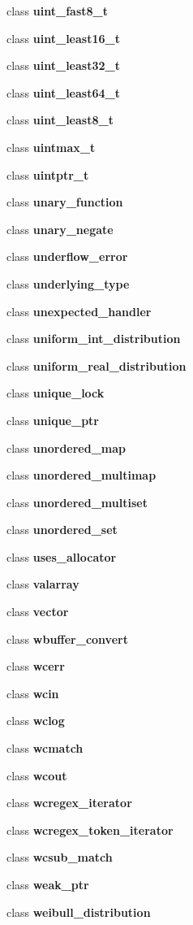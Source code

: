 \begin{DoxyCompactItemize}
class {\bf uint\+\_\+fast8\+\_\+t}
\item 
class {\bf uint\+\_\+least16\+\_\+t}
\item 
class {\bf uint\+\_\+least32\+\_\+t}
\item 
class {\bf uint\+\_\+least64\+\_\+t}
\item 
class {\bf uint\+\_\+least8\+\_\+t}
\item 
class {\bf uintmax\+\_\+t}
\item 
class {\bf uintptr\+\_\+t}
\item 
class {\bf unary\+\_\+function}
\item 
class {\bf unary\+\_\+negate}
\item 
class {\bf underflow\+\_\+error}
\item 
class {\bf underlying\+\_\+type}
\item 
class {\bf unexpected\+\_\+handler}
\item 
class {\bf uniform\+\_\+int\+\_\+distribution}
\item 
class {\bf uniform\+\_\+real\+\_\+distribution}
\item 
class {\bf unique\+\_\+lock}
\item 
class {\bf unique\+\_\+ptr}
\item 
class {\bf unordered\+\_\+map}
\item 
class {\bf unordered\+\_\+multimap}
\item 
class {\bf unordered\+\_\+multiset}
\item 
class {\bf unordered\+\_\+set}
\item 
class {\bf uses\+\_\+allocator}
\item 
class {\bf valarray}
\item 
class {\bf vector}
\item 
class {\bf wbuffer\+\_\+convert}
\item 
class {\bf wcerr}
\item 
class {\bf wcin}
\item 
class {\bf wclog}
\item 
class {\bf wcmatch}
\item 
class {\bf wcout}
\item 
class {\bf wcregex\+\_\+iterator}
\item 
class {\bf wcregex\+\_\+token\+\_\+iterator}
\item 
class {\bf wcsub\+\_\+match}
\item 
class {\bf weak\+\_\+ptr}
\item 
class {\bf weibull\+\_\+distribution}

\end{DoxyCompactItemize}
